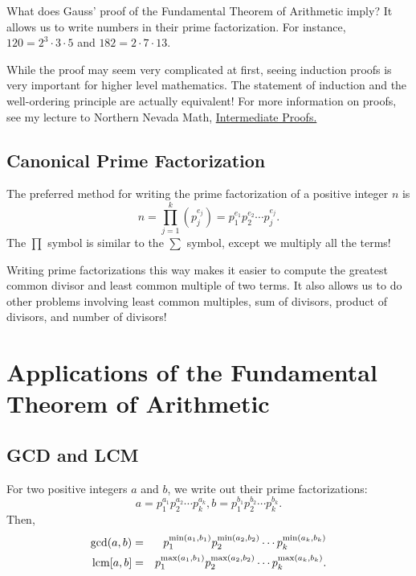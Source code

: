 What does Gauss' proof of the Fundamental Theorem of Arithmetic imply? It allows us to write numbers in their prime factorization. For instance, $120=2^3\cdot 3\cdot 5$ and $182=2\cdot 7\cdot 13$. 

While the proof may seem very complicated at first, seeing induction proofs is very important for higher level mathematics. The statement of induction and the well-ordering principle are actually equivalent! For more information on proofs, see my lecture to Northern Nevada Math, \color{Orange}\href{https://numbertheoryguydotcom.files.wordpress.com/2016/03/intermediateproofs.pdf}{Intermediate Proofs.}

\clearpage

\subsection{Canonical Prime Factorization}

\color{black} The preferred method for writing the prime factorization of a positive integer $n$ is $$n=\prod_{j=1}^{k}\left(p_j^{e_j}\right)=p_1^{e_1}p_2^{e_2}\cdots p_j^{e_j}.$$ 
The $\prod$ symbol is similar to the $\sum$ symbol, except we multiply all the terms!

Writing prime factorizations this way makes it easier to compute the greatest common divisor and least common multiple of two terms. It also allows us to do other problems involving least common multiples, sum of divisors, product of divisors, and number of divisors!  

\section{Applications of the Fundamental Theorem of Arithmetic}

\subsection{GCD and LCM}

For two positive integers $a$ and $b$, we write out their prime factorizations: $$a=p_1^{a_1}p_2^{a_2}\cdots p_k^{a_k}, b=p_1^{b_1}p_2^{b_2}\cdots p_k^{b_k}.$$ Then, \begin{eqnarray*} \gcd(a,b)&=&p_1^{\min(a_1, b_1)}p_2^{\min(a_2, b_2)}\cdots p_k^{\min(a_k, b_k)} \\ \operatorname{lcm}[a,b]&=&p_1^{\max(a_1, b_1)}p_2^{\max(a_2, b_2)}\cdots p_k^{\max(a_k, b_k)}. \end{eqnarray*}
\clearpage

